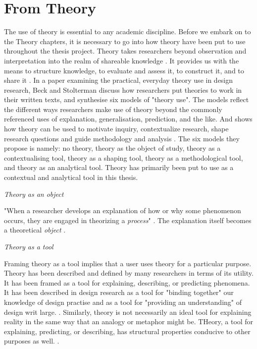 \section{From Theory}
The use of theory is essential to any academic discipline. Before we embark on to the Theory chapters, it is necessary to go into how theory have been put to use throughout the thesis project. Theory takes researchers beyond observation and interpretation into the realm of shareable knowledge \autocite[p. 126]{beck_examining_2016}. It provides us with the means to structure knowledge, to evaluate and assess it, to construct it, and to share it \autocite[p. 126]{beck_examining_2016}. In a paper examining the practical, everyday theory use in design research, Beck and Stolterman discuss how researchers put theories to work in their written texts, and synthesise six models of "theory use". The models reflect the different ways researchers make use of theory beyond the commonly referenced uses of explanation, generalisation, prediction, and the like. And shows how theory can be used to motivate inquiry, contextualize research, shape research questions and guide methodology and analysis \autocite[p. 134]{beck_examining_2016}. The six models they propose is namely: no theory, theory as the object of study, theory as a contextualising tool, theory as a shaping tool, theory as a methodological tool, and theory as an analytical tool. Theory has primarily been put to use as a contextual and analytical tool in this thesis. 

\par \emph{Theory as an object} \par
"When a researcher develops an explanation of how or why some phenomenon occurs, they are engaged in theorizing a \emph{process}" \autocite[p.126]{beck_examining_2016}. The explanation itself becomes a theoretical \emph{object} \autocite[p. 126]{beck_examining_2016}.  


\par \emph{Theory as a tool} \par
Framing theory as a tool implies that a user uses theory for a particular purpose. Theory has been described and defined by many researchers in terms of its utility. It has been framed as a tool for explaining, describing, or predicting phenomena. It has been described in design research as a tool for "binding together" our knowledge of design practise and as a tool for "providing an understanding" of design writ large. \autocite[p. 127]{beck_examining_2016}. Similarly, theory is not necessarily an ideal tool for explaining reality in the same way that an analogy or metaphor might be. THeory, a tool for explaining, predicting, or describing, has structural properties conducive to other purposes as well. \autocite[p. 127]{beck_examining_2016}.


